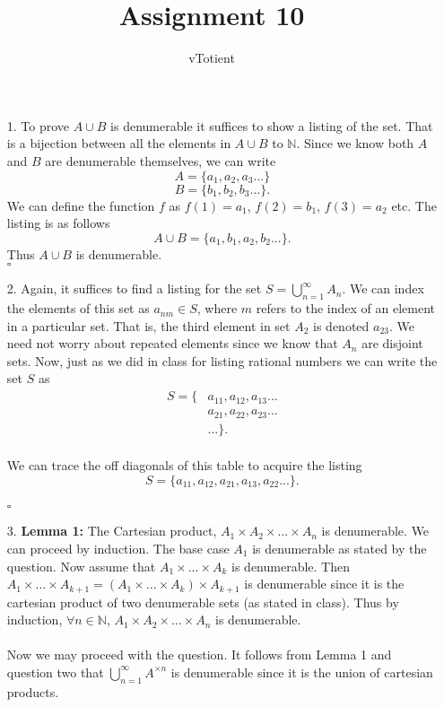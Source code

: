 \documentclass[12pt]{article}
\newcommand{\N}{\mathbb{N}}
\begin{document}
\title{Assignment 10} 
\author{vTotient \\} 
    
\maketitle

 \begin{enumerate}
    \item[1. ]To prove $A\cup B$ is denumerable it suffices to show a listing of the set. That is a bijection between all the elements in $A\cup B$ to $\N$. Since we know both $A$ and $B$ are denumerable themselves, we can write
    $$A=\{ a_1,a_2,a_3...\} $$
    $$B= \{b_1,b_2,b_3...\}. $$
    We can define the function $f$ as $f(1)=a_1$, $f(2)=b_1$, $f(3)=a_2$ etc. The listing is as follows
    $$ A\cup B = \{a_1, b_1, a_2, b_2 ... \}. $$ Thus $A\cup B$ is denumerable.
    \\ $\square$

    \item[2. ]Again, it suffices to find a listing for the set $S=\bigcup^{\infty}_{n=1}A_n$. We can index the elements of this set as $a_{nm}\in S$, where $m$ refers to the index of an element in a particular set. That is, the third element in set $A_2$ is denoted $a_{23}$. We need not worry about repeated elements since we know that $A_n$ are disjoint sets. Now, just as we did in class for listing rational numbers we can write the set $S$ as 
        \begin{align*}
            S = \{& a_{11}, a_{12}, a_{13}...\\
                  & a_{21}, a_{22}, a_{23}... \\
                  & ... \}.
        \end{align*}
    \\ We can trace the off diagonals of this table to acquire the listing 
    $$ S= \{a_{11}, a_{12}, a_{21}, a_{13}, a_{22}...\}. $$
    \\ $\square$
    
    \item[3. ] \textbf{Lemma 1: }The Cartesian product, $A_1\times A_2 \times...\times A_n$ is denumerable. We can proceed by induction. The base case $A_1$ is denumerable as stated by the question. Now assume that $A_1\times...\times A_k$ is denumerable. Then $A_1\times...\times A_{k+1}=(A_1\times...\times A_k)\times A_{k+1}$ is denumerable since it is the cartesian product of two denumerable sets (as stated in class). Thus by induction, $\forall n\in\N$, $A_1\times A_2 \times...\times A_n$ is denumerable.
    \\ \\
    Now we may proceed with the question. It follows from Lemma 1 and question two that $\bigcup^{\infty}_{n=1}A^{\times n}$ is denumerable since it is the union of cartesian products. 
    

\end{enumerate}
\end{document}
